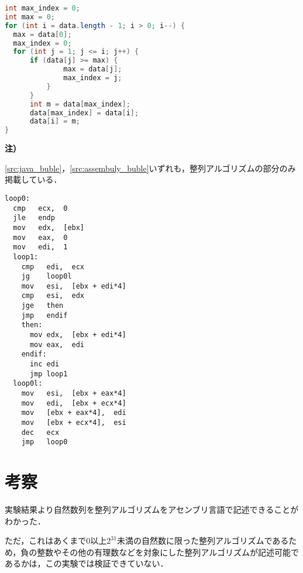 \begin{minipage}[t]{0.5\linewidth}
    \centering
    \begin{lstlisting}[caption={{\ttfamily Java}}, label={src:java_buble}, language={Java},frame={left}]
int max_index = 0;
int max = 0;
for (int i = data.length - 1; i > 0; i--) {
  max = data[0];
  max_index = 0;
  for (int j = 1; j <= i; j++) {
      if (data[j] >= max) {
              max = data[j];
              max_index = j;
          }
      }
      int m = data[max_index];
      data[max_index] = data[i];
      data[i] = m;
}
    \end{lstlisting}
    \begin{flushleft}
        \begin{framed}
            \noindent\textbf{注）}\par
            \ref{src:java_buble}，\ref{src:assembuly_buble}いずれも，整列アルゴリズムの部分のみ掲載している．
        \end{framed}
    \end{flushleft}
\end{minipage}
\hspace{3em}
\begin{minipage}[t]{0.4\linewidth}
    \begin{lstlisting}[frame={left},caption={アセンブリ},label={src:assembuly_buble}]
loop0:
  cmp   ecx,  0
  jle   endp
  mov   edx,  [ebx]
  mov   eax,  0    
  mov   edi,  1
  loop1:
    cmp   edi,  ecx
    jg    loop0l
    mov   esi,  [ebx + edi*4]
    cmp   esi,  edx
    jge   then
    jmp   endif
    then:
      mov edx,  [ebx + edi*4]
      mov eax,  edi          
    endif:
      inc edi
      jmp loop1
  loop0l:
    mov   esi,  [ebx + eax*4]
    mov   edi,  [ebx + ecx*4]
    mov   [ebx + eax*4],  edi
    mov   [ebx + ecx*4],  esi
    dec   ecx
    jmp   loop0
\end{lstlisting}
\end{minipage}
\section{考察}
実験結果より自然数列を整列アルゴリズムをアセンブリ言語で記述できることがわかった．\par
ただ，これはあくまで\(0\)以上\(2^{31}\)未満の自然数に限った整列アルゴリズムであるため，負の整数やその他の有理数などを対象にした整列アルゴリズムが記述可能であるかは，この実験では検証できていない．